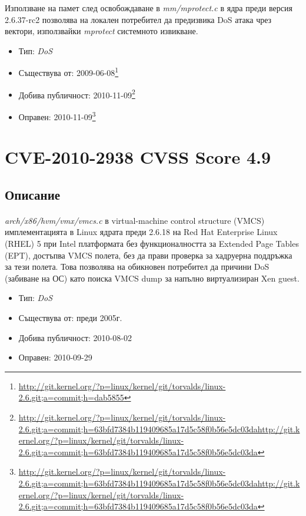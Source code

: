 \documentclass[a4paper,12pt,leqno]{article}
\begin{document}
Използване на памет след освобождаване в \textit{mm/mprotect.c} в ядра преди версия 2.6.37-rc2 позволява
на локален потребител да предизвика DoS атака чрез вектори, използвайки \textit{mprotect} системното извикване.
\begin{itemize}
    \item Тип: \textit{DoS}
    \item Съществува от: 2009-06-08\footnote{\url{http://git.kernel.org/?p=linux/kernel/git/torvalds/linux-2.6.git;a=commit;h=dab5855}}
    \item Добива публичност: 2010-11-09\footnote{\url{http://git.kernel.org/?p=linux/kernel/git/torvalds/linux-2.6.git;a=commit;h=63bfd7384b119409685a17d5c58f0b56e5dc03dahttp://git.kernel.org/?p=linux/kernel/git/torvalds/linux-2.6.git;a=commit;h=63bfd7384b119409685a17d5c58f0b56e5dc03da}}
    \item Оправен:  2010-11-09\footnote{\url{http://git.kernel.org/?p=linux/kernel/git/torvalds/linux-2.6.git;a=commit;h=63bfd7384b119409685a17d5c58f0b56e5dc03dahttp://git.kernel.org/?p=linux/kernel/git/torvalds/linux-2.6.git;a=commit;h=63bfd7384b119409685a17d5c58f0b56e5dc03da}}
\end{itemize}




\section{CVE-2010-2938 CVSS Score 4.9}
\subsection{Описание}
\paragraph{}
\textit{arch/x86/hvm/vmx/vmcs.c}  в virtual-machine control structure (VMCS) имплементацията в Linux ядрата преди 2.6.18 на Red Hat Enterprise Linux (RHEL) 5 при Intel платформата без функционалността за Extended Page Tables (EPT), достъпва VMCS полета, без да прави проверка за хадруерна поддръжка за тези полета. Това позволява на обикновен потребител да причини DoS (забиване на ОС) като поиска VMCS dump за напълно виртуализиран Xen guest.

\begin{itemize}
    \item Тип: \textit{DoS}
    \item Съществува от: преди 2005г.
  	\item Добива публичност: 2010-08-02
    \item Оправен: 2010-09-29
\end{itemize}
\end{document}
